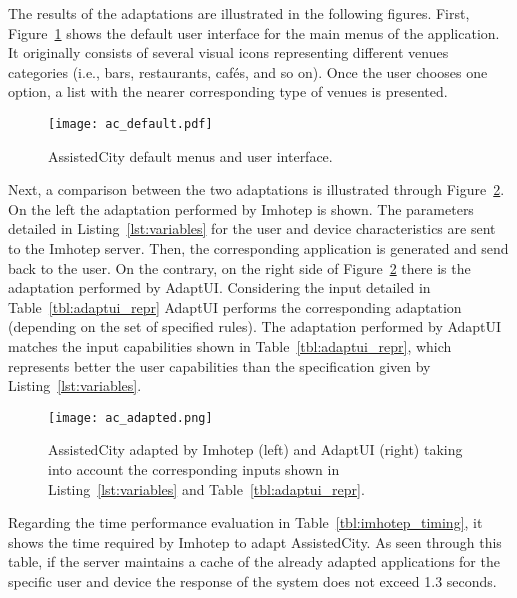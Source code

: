 The results of the adaptations are illustrated in the following figures. First,
Figure~\ref{fig:ac_default} shows the default user interface for the main menus 
of the application. It originally consists of several visual icons representing 
different venues categories (i.e., bars, restaurants, cafés, and so on). Once the 
user chooses one option, a list with the nearer corresponding type of venues
is presented.

\begin{figure}
\centering
\texttt{[image: ac\_default.pdf]}
\caption{AssistedCity default menus and user interface.}
\label{fig:ac_default}
\end{figure}

Next, a comparison between the two adaptations is illustrated through 
Figure~\ref{fig:ac_adapted}. On the left the adaptation performed by Imhotep is 
shown. The parameters detailed in Listing~\ref{lst:variables} for the user and 
device characteristics are sent to the Imhotep server. Then, the corresponding
application is generated and send back to the user. On the contrary, on the 
right side of Figure~\ref{fig:ac_adapted} there is the adaptation performed by 
AdaptUI. Considering the input detailed in Table~\ref{tbl:adaptui_repr} AdaptUI 
performs the corresponding adaptation (depending on the set of specified rules).
The adaptation performed by AdaptUI matches the input capabilities shown in
Table~\ref{tbl:adaptui_repr}, which represents better the user capabilities
than the specification given by Listing~\ref{lst:variables}.

\begin{figure}
\centering
\texttt{[image: ac\_adapted.png]}
\caption{AssistedCity adapted by Imhotep (left) and AdaptUI (right) taking 
into account the corresponding inputs shown in Listing~\ref{lst:variables} and 
Table~\ref{tbl:adaptui_repr}.}
\label{fig:ac_adapted}
\end{figure}



Regarding the time performance evaluation in Table~\ref{tbl:imhotep_timing}, it 
shows the time required by Imhotep to adapt AssistedCity. As seen through this 
table, if the server maintains a cache of the already adapted applications for 
the specific user and device the response of the system does not exceed 1.3
seconds. 

